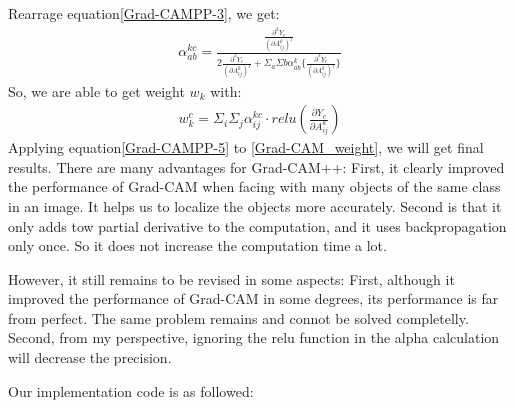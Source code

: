 \documentclass[conference]{IEEEtran}
\begin{document}
Rearrage equation\ref{Grad-CAMPP-3}, we get:
    \begin{equation}
        \begin{aligned}
            \alpha_{ab}^{kc}=\frac{\frac{\partial^{2} Y_{c}}{(\partial A_{ij}^{k})^_{2}}}{2\frac{\partial^{2} Y_{c}}{(\partial A_{ij}^{k})^_{2}}+\Sigma_{a}\Sigma{b}\alpha_{ab}^{k}\{\frac{\partial^{3} Y_{c}}{(\partial A_{ij}^{k})^_{3}}\}}
            \label{Grad-CAMPP-4}
        \end{aligned}
        \end{equation}
So, we are able to get weight $w_{k}$ with:
\begin{equation}
    \begin{aligned}
        w_{k}^{c}=\Sigma_{i}\Sigma_{j}\alpha_{ij}^{kc}·relu(\frac{\partial Y_{c}}{\partial A_{ij}^{k}})
        \label{Grad-CAMPP-5}
    \end{aligned}
    \end{equation}
Applying equation\ref{Grad-CAMPP-5} to \ref{Grad-CAM_weight}, we will get final results.
There are many advantages for Grad-CAM++: First, it clearly improved the performance of Grad-CAM when facing with many objects of the same class in an image. It helps us to localize the objects more accurately. 
Second is that it only adds tow partial derivative to the computation, and it uses backpropagation only once. So it does not increase the computation time a lot.\par
However, it still remains to be revised in some aspects: First, although it improved the performance of Grad-CAM in some degrees, its performance is far from perfect. The same problem remains and connot be solved completelly. 
Second, from my perspective, ignoring the relu function in the alpha calculation will decrease the precision.\par
Our implementation code is as followed:
\end{document}
